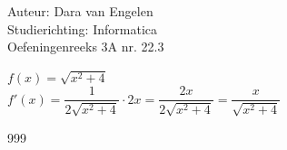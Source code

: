 \documentclass[a4paper]{article}
\begin{document}
  
\noindent \large Auteur: Dara van Engelen\\
\noindent \large Studierichting: Informatica\\
\noindent \large Oefeningenreeks 3A nr. 22.3\\

\medskip

\normalsize

$f(x) = \sqrt{x^2+4}$\\

$f'(x) = \dfrac{1}{2\sqrt{x^2+4}} \cdot 2x = \dfrac{2x}{2\sqrt{x^2+4}} = \dfrac{x}{\sqrt{x^2+4}}$\\


\begin{thebibliography}{999}
\end{thebibliography}
\end{document}
